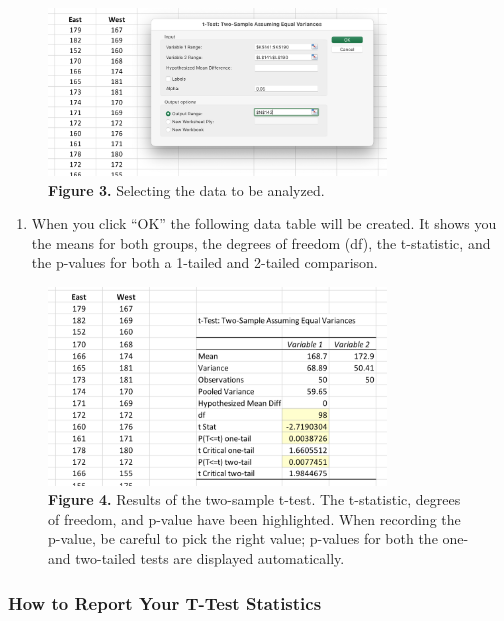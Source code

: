 \documentclass[
]{book}
\providecommand{\tightlist}{%
  \setlength{\itemsep}{0pt}\setlength{\parskip}{0pt}}
\begin{document}
\begin{figure}
\centering
\includegraphics[width=0.8\textwidth,height=\textheight]{images/Analysis_dialog.png}
\caption{\textbf{Figure 3.} Selecting the data to be analyzed.}
\end{figure}

\begin{enumerate}
\def\labelenumi{\arabic{enumi}.}
\setcounter{enumi}{4}
\tightlist
\item
  When you click ``OK'' the following data table will be created. It shows you the means for both groups, the degrees of freedom (df), the t-statistic, and the p-values for both a 1-tailed and 2-tailed comparison.
\end{enumerate}

\begin{figure}
\centering
\includegraphics[width=0.8\textwidth,height=\textheight]{images/Analysis_table.png}
\caption{\textbf{Figure 4.} Results of the two-sample t-test. The t-statistic, degrees of freedom, and p-value have been highlighted. When recording the p-value, be careful to pick the right value; p-values for both the one- and two-tailed tests are displayed automatically.}
\end{figure}

\hypertarget{how-to-report-your-t-test-statistics}{%
\subsubsection{How to Report Your T-Test Statistics}\label{how-to-report-your-t-test-statistics}}
\end{document}
